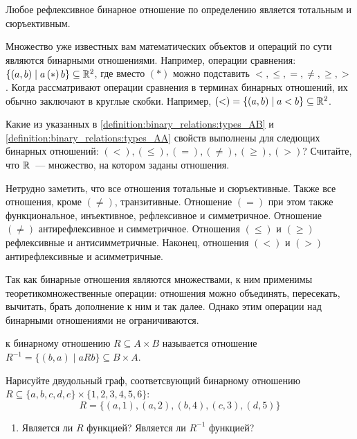\begin{remark}
    Любое рефлексивное бинарное отношение по определению является тотальным и сюръективным.
\end{remark}

Множество уже известных вам математических объектов и операций по сути являются бинарными отношениями.
Например, операции сравнения: $ \{ (a, b) \mid a \, (*) \, b \} \subseteq \mathbb{R}^2 $, где вместо $ (*) $ можно подставить $ <, \leqslant, =, \neq, \geqslant, > $.
Когда рассматривают операции сравнения в терминах бинарных отношений, их обычно заключают в круглые скобки.
Например, $ (<) = \{ (a, b) \mid a < b \} \subseteq \mathbb{R}^2 $.

\begin{Exercise}[counter=SecExercise]
    \noindent
    Какие из указанных в \ref{definition:binary_relations:types_AB} и \ref{definition:binary_relations:types_AA}
    свойств выполнены для следющих бинарных отношений: $ (<), (\leqslant), (=), (\neq), (\geqslant), (>) $?
    Считайте, что $ \mathbb{R} $~--- множество, на котором заданы отношения.
\end{Exercise}

\begin{Answer}
    \noindent
    Нетрудно заметить, что все отношения тотальные и сюръективные.
    Также все отношения, кроме $ (\neq) $, транзитивные.
    Отношение $ (=) $ при этом также функциональное, инъективное, рефлексивное и симметричное.
    Отношение $ (\neq) $ антирефлексивное и симметричное.
    Отношения $ (\leqslant) $ и $ (\geqslant) $ рефлексивные и антисимметричные.
    Наконец, отношения $ (<) $ и $ (>) $ антирефлексивные и асимметричные.
\end{Answer}

Так как бинарные отношения являются множествами, к ним применимы теоретикомножественные операции:
отношения можно объединять, пересекать, вычитать, брать дополнение к ним и так далее.
Однако этим операции над бинарными отношениями не ограничиваются.

\begin{definition}
     к бинарному отношению $ R \subseteq A \times B $ называется отношение
    $ R^{-1} = \{(b, a) \mid a R b \} \subseteq B \times A $.
\end{definition}

\begin{Exercise}[counter=SecExercise, label={exercise:relations:is_function}]
    \noindent
    Нарисуйте двудольный граф, соответсвующий бинарному отношению
    $ R \subseteq \{a, b, c, d, e\} \times \{1, 2, 3, 4, 5, 6\} $:
    \[
        R = \{ (a, 1), (a, 2), (b, 4), (c, 3), (d, 5) \}
    \]
    \begin{enumerate}[label=\textbf{\alph*)}]
        \item Является ли $ R $ функцией?
        \inlineitem Является ли $ R^{-1} $ функцией?
    \end{enumerate}
\end{Exercise}

